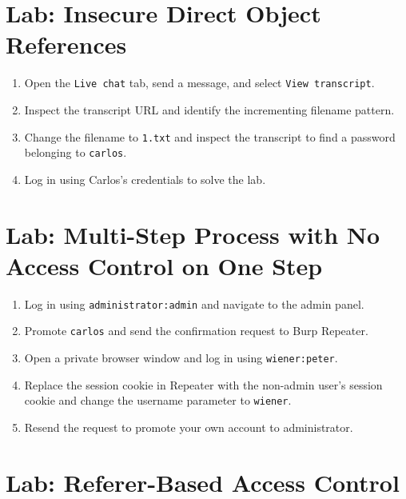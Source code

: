 \documentclass[11pt,a4paper]{article}
\begin{document}
\section{Lab: Insecure Direct Object References}
\vspace{0.3cm}

\begin{enumerate}
    \item Open the \texttt{Live chat} tab, send a message, and select \texttt{View transcript}.
    \item Inspect the transcript URL and identify the incrementing filename pattern.
    \item Change the filename to \texttt{1.txt} and inspect the transcript to find a password belonging to \texttt{carlos}.
    \item Log in using Carlos's credentials to solve the lab.
\end{enumerate}

\section{Lab: Multi-Step Process with No Access Control on One Step}
\vspace{0.3cm}

\begin{enumerate}
    \item Log in using \texttt{administrator:admin} and navigate to the admin panel.
    \item Promote \texttt{carlos} and send the confirmation request to Burp Repeater.
    \item Open a private browser window and log in using \texttt{wiener:peter}.
    \item Replace the session cookie in Repeater with the non-admin user's session cookie and change the username parameter to \texttt{wiener}.
    \item Resend the request to promote your own account to administrator.
\end{enumerate}

\section{Lab: Referer-Based Access Control}
\vspace{0.3cm}
\end{document}
